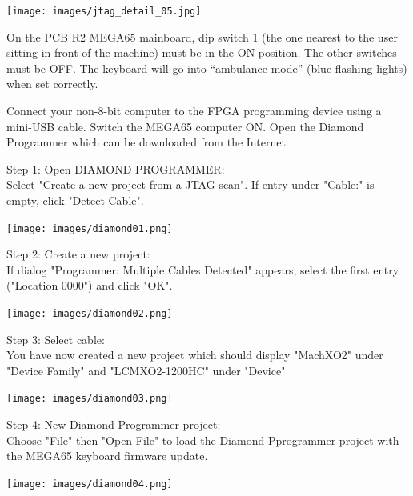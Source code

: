 \texttt{[image: images/jtag\_detail\_05.jpg]}


On the PCB R2 MEGA65 mainboard, dip switch 1 (the one nearest to the user
sitting in front of the machine) must be in the ON position. The other
switches must be OFF. The keyboard will go into ``ambulance mode''
(blue flashing lights) when set correctly.

Connect your non-8-bit computer to the FPGA programming device using a
mini-USB cable. Switch the MEGA65 computer ON. Open the Diamond Programmer
which can be downloaded from the Internet.

\begin{minipage}{\linewidth}
Step 1: Open DIAMOND PROGRAMMER: \\
Select "Create a new project from a JTAG scan". If entry
under "Cable:" is empty, click "Detect Cable".
\\
  \begin{center}
  \texttt{[image: images/diamond01.png]}
  \end{center}
\end{minipage}

\vspace{5mm}

\begin{minipage}{\linewidth}
Step 2: Create a new project: \\
If dialog "Programmer: Multiple Cables Detected" appears,
select the first entry ("Location 0000") and click "OK".
  \begin{center}
  \texttt{[image: images/diamond02.png]}
  \end{center}
\end{minipage}


\begin{minipage}{\linewidth}
Step 3: Select cable: \\
You have now created a new project which should display
"MachXO2" under "Device Family" and "LCMXO2-1200HC" under "Device"
  \begin{center}
  \texttt{[image: images/diamond03.png]}
  \end{center}
\end{minipage}

\vspace{5mm}

\begin{minipage}{\linewidth}
Step 4: New Diamond Programmer project: \\
Choose "File" then "Open File" to load the Diamond Pprogrammer
project with the MEGA65 keyboard firmware update.
  \begin{center}
  \texttt{[image: images/diamond04.png]}
  \end{center}
\end{minipage}


